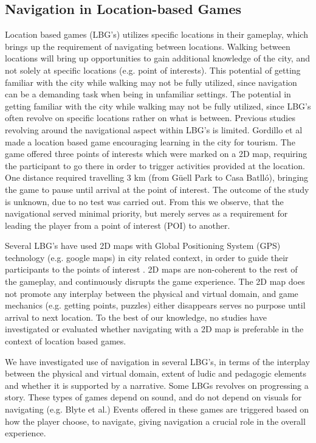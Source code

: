 \subsection{Navigation in Location-based Games}
Location based games (LBG's) utilizes specific locations in their gameplay, which brings up the requirement of navigating between locations. Walking between locations will bring up opportunities to gain additional knowledge of the city, and not solely at specific locations (e.g. point of interests). This potential of getting familiar with the city while walking may not be fully utilized, since navigation can be a demanding task when being in unfamiliar settings. The potential in getting familiar with the city while walking may not be fully utilized, since LBG's often revolve on specific locations rather on what is between. Previous studies revolving around the navigational aspect within LBG’s is limited. 
Gordillo et al made a location based game encouraging learning in the city for tourism\cite{Learninggamified}. The game offered three points of interests which were marked on a 2D map, requiring the participant to go there in order to trigger activities provided at the location.  One distance required travelling 3 km (from Güell Park to Casa Batlló), bringing the game to pause until arrival at the point of interest.  The outcome of the study is unknown, due to no test was carried out.  From this we observe, that the navigational served minimal priority, but merely serves as a requirement for leading the player from a point of interest (POI) to another. 

Several LBG's have used 2D maps with Global Positioning System (GPS) technology (e.g. google maps) in city related context, in order to guide their participants to the points of interest \cite{TheoreticalAndMethod, Learninggamified, knowcity, Carrigy:2010:DEP:1868914.1868929, GamingTourism, Procyk:2013:GLG:2468356.2468550, Bell:2009:ESN:1518701.1518723}. 2D maps are non-coherent to the rest of the gameplay, and continuously disrupts the game experience. The 2D map does not promote any interplay between the physical and virtual domain, and game mechanics (e.g. getting points, puzzles) either disappears serves no purpose until arrival to next location.  To the best of our knowledge, no studies have investigated or evaluated whether navigating with a 2D map is preferable in the context of location based games. 

We have investigated use of navigation in several LBG's, in terms of the interplay between the physical and virtual domain, extent of ludic and pedagogic elements and whether it is supported by a narrative. Some LBGs revolves on progressing a story. These types of games depend on sound, and do not depend on visuals for navigating (e.g. Blyte et al.) Events offered in these games are triggered based on how the player choose, to navigate, giving navigation a crucial role in the overall experience.

